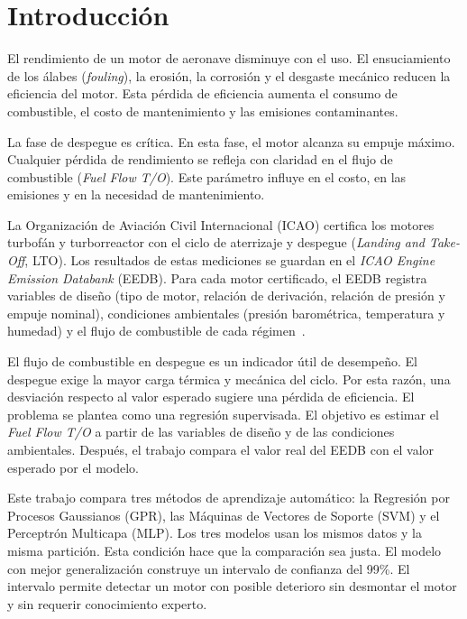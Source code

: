 \thispagestyle{empty}

\chapter{Introducción}


El rendimiento de un motor de aeronave disminuye con el uso. El ensuciamiento de los álabes (\textit{fouling}), la erosión, la corrosión y el desgaste mecánico reducen la eficiencia del motor. Esta pérdida de eficiencia aumenta el consumo de combustible, el costo de mantenimiento y las emisiones contaminantes.

La fase de despegue es crítica. En esta fase, el motor alcanza su empuje máximo. Cualquier pérdida de rendimiento se refleja con claridad en el flujo de combustible (\textit{Fuel Flow T/O}). Este parámetro influye en el costo, en las emisiones y en la necesidad de mantenimiento.

La Organización de Aviación Civil Internacional (ICAO) certifica los motores turbofán y turborreactor con el ciclo de aterrizaje y despegue (\textit{Landing and Take-Off}, LTO). Los resultados de estas mediciones se guardan en el \textit{ICAO Engine Emission Databank} (EEDB). Para cada motor certificado, el EEDB registra variables de diseño (tipo de motor, relación de derivación, relación de presión y empuje nominal), condiciones ambientales (presión barométrica, temperatura y humedad) y el flujo de combustible de cada régimen~\cite{Kurt2024}.

El flujo de combustible en despegue es un indicador útil de desempeño. El despegue exige la mayor carga térmica y mecánica del ciclo. Por esta razón, una desviación respecto al valor esperado sugiere una pérdida de eficiencia. El problema se plantea como una regresión supervisada. El objetivo es estimar el \textit{Fuel Flow T/O} a partir de las variables de diseño y de las condiciones ambientales. Después, el trabajo compara el valor real del EEDB con el valor esperado por el modelo.

Este trabajo compara tres métodos de aprendizaje automático: la Regresión por Procesos Gaussianos (GPR), las Máquinas de Vectores de Soporte (SVM) y el Perceptrón Multicapa (MLP). Los tres modelos usan los mismos datos y la misma partición. Esta condición hace que la comparación sea justa. El modelo con mejor generalización construye un intervalo de confianza del 99\%. El intervalo permite detectar un motor con posible deterioro sin desmontar el motor y sin requerir conocimiento experto.

